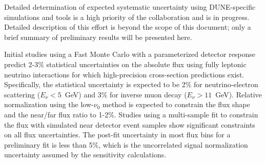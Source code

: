 %
Detailed determination of expected systematic uncertainty using DUNE-specific
simulations and tools is a high priority of the collaboration and is in progress.
Detailed description of this effort is beyond the scope of this document; only
a brief summary of preliminary results will be presented here. 

Initial studies using a Fast Monte Carlo with a parameterized detector response
predict 2-3\% statistical uncertainties on the absolute flux using fully 
leptonic neutrino interactions for which high-precision cross-section predictions 
exist. Specifically,
the statistical uncertainty is expected to be 2\% for neutrino-electron
scattering ($E_\nu<5$~GeV) and 3\% for inverse muon decay ($E_\nu>11$~GeV).
Relative normalization using the low-$\nu_0$ method is
expected to constrain the flux shape and the near/far flux ratio to 1-2\%.
Studies using a multi-sample fit  to constrain the flux with simulated near detector
event samples show significant constraints on all flux
uncertainties. The post-fit uncertainty 
in most flux bins for a preliminary fit is less
than 5\%, which is the uncorrelated \numu signal normalization
uncertainty assumed by the sensitivity calculations. 

